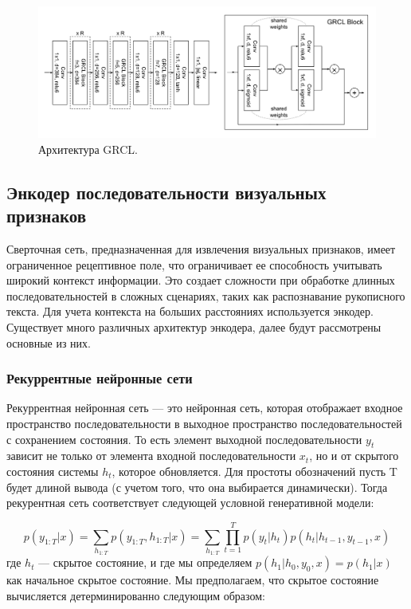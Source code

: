 \begin{figure}
    \centering
    \includegraphics[scale=0.3]{./images/GRCL.png}
    \caption{\protect\hypertarget{image4}{Архитектура GRCL.}}
\end{figure}

\subsection{Энкодер последовательности визуальных признаков}
Сверточная сеть, предназначенная для извлечения визуальных признаков, имеет ограниченное рецептивное поле, что ограничивает ее способность учитывать широкий контекст информации. Это создает сложности при обработке длинных последовательностей в сложных сценариях, таких как распознавание рукописного текста. Для учета контекста на больших расстояниях используется энкодер. Существует много различных
архитектур энкодера, далее будут рассмотрены основные из них.

\subsubsection{Рекуррентные нейронные сети}
Рекуррентная нейронная сеть — это нейронная сеть, которая отображает входное пространство последовательности в выходное пространство последовательностей с сохранением состояния. То есть элемент выходной последовательности $y_t$ зависит не только от элемента входной последовательности $x_t$, но и от скрытого состояния системы $h_t$, которое обновляется. Для простоты обозначений пусть T будет длиной вывода (с учетом того, что она выбирается динамически). Тогда рекурентная сеть соответствует следующей условной генеративной модели:

\begin{equation}
	p(y_{1:T} | x) = \sum_{h_{1:T}} p(y_{1:T}, h_{1:T} | x) = \sum_{h_{1:T}} \prod_{t=1}^{T} p(y_{t} | h_{t})p(h_{t} | h_{t-1}, y_{t-1}, x)
\end{equation}
где $h_t$ — скрытое состояние, и где мы определяем $p(h_1 |h_0, y_0, x) = p(h_1 |x)$ как начальное скрытое состояние. Мы предполагаем, что скрытое состояние вычисляется детерминированно следующим образом:

